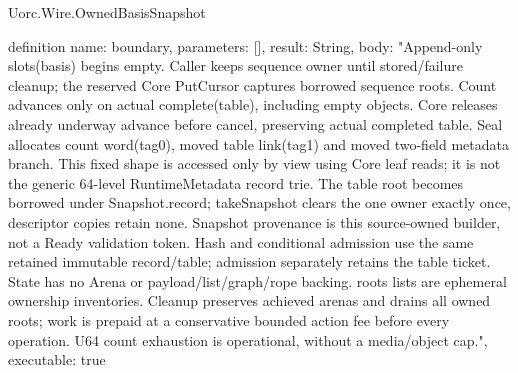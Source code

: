 \begin{lexlean}{Uorc.Wire.OwnedBasisSnapshot}
\begin{semanticmodule}
definition{
  name: boundary,
  parameters: [],
  result: String,
  body: "Append-only slots(basis) begins empty. Caller keeps sequence owner until stored/failure cleanup; the reserved Core PutCursor captures borrowed sequence roots. Count advances only on actual complete(table), including empty objects. Core releases already underway advance before cancel, preserving actual completed table. Seal allocates count word(tag0), moved table link(tag1) and moved two-field metadata branch. This fixed shape is accessed only by view using Core leaf reads; it is not the generic 64-level RuntimeMetadata record trie. The table root becomes borrowed under Snapshot.record; takeSnapshot clears the one owner exactly once, descriptor copies retain none. Snapshot provenance is this source-owned builder, not a Ready validation token. Hash and conditional admission use the same retained immutable record/table; admission separately retains the table ticket. State has no Arena or payload/list/graph/rope backing. roots lists are ephemeral ownership inventories. Cleanup preserves achieved arenas and drains all owned roots; work is prepaid at a conservative bounded action fee before every operation. U64 count exhaustion is operational, without a media/object cap.",
  executable: true
}
\end{semanticmodule}
\end{lexlean}
